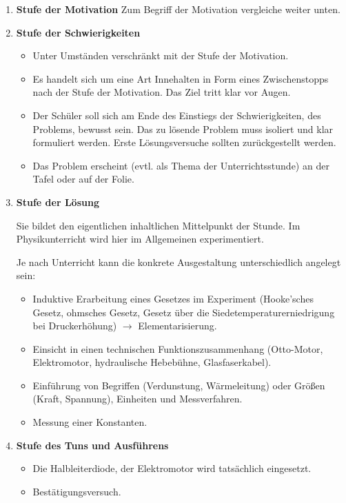 \begin{enumerate}
	\item {\bf Stufe der Motivation} Zum Begriff der Motivation
	vergleiche weiter unten.
	
	\item {\bf Stufe der Schwierigkeiten}
	\begin{itemize}
		\item Unter Umst\"{a}nden verschr\"{a}nkt mit der Stufe der Motivation.
		\item Es handelt sich um eine Art Innehalten in Form eines
		Zwischenstopps nach der Stufe der Motivation.
		Das Ziel tritt klar vor Augen.
		\item Der Sch\"{u}ler soll sich am Ende des Einstiegs der
		Schwierigkeiten, des Problems, bewusst sein.
		Das zu l\"{o}sende Problem muss isoliert und klar formuliert werden.
		Erste L\"{o}sungsversuche sollten zur\"{u}ckgestellt werden.
		\item Das Problem erscheint
		(evtl. als Thema der Unterrichtsstunde)
		an der Tafel oder auf der Folie.
		\autocite[S. 207]{BleichrothDahnckeJung}
	\end{itemize}
	
	\item {\bf Stufe der L\"{o}sung}
	
	Sie bildet den eigentlichen inhaltlichen Mittelpunkt der Stunde.
	Im Physikunterricht wird hier im Allgemeinen experimentiert.
	
	Je nach Unterricht kann die konkrete Ausgestaltung
	unterschiedlich angelegt sein:
	
	\begin{itemize}
		\item Induktive Erarbeitung eines Gesetzes im Experiment
		(Hooke'sches Gesetz, ohmsches Gesetz, Gesetz \"{u}ber die Siedetemperaturerniedrigung bei Druckerh\"{o}hung)
		$\to$ Elementarisierung.
		\item Einsicht in einen technischen Funktionszusammenhang
		(Otto-Motor, Elektromotor, hydraulische Hebeb\"{u}hne, Glasfaserkabel).
		\item Einf\"{u}hrung von Begriffen (Verdunstung, W\"{a}rmeleitung) oder
		Gr\"{o}{\ss}en (Kraft, Spannung), Einheiten und Messverfahren.
		\item Messung einer Konstanten.
	\end{itemize}
	
	\item {\bf Stufe des Tuns und Ausf\"{u}hrens}
	\begin{itemize}
		\item Die Halbleiterdiode, der Elektromotor wird tats\"{a}chlich eingesetzt.
		\item Best\"{a}tigungsversuch.
	\end{itemize}
	

\end{enumerate}
